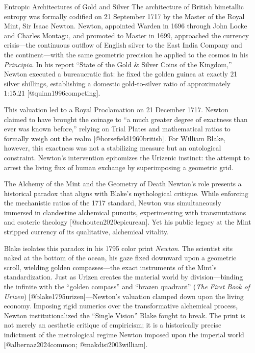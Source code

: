 \documentclass[
  ignorenonframetext,
]{beamer}
\author{\texorpdfstring{}{}}
\date{}
\begin{document}
\begin{frame}{Entropic Architectures of Gold and Silver}
\protect{}\label{entropic-architectures-of-gold-and-silver}
The architecture of British bimetallic entropy was formally codified on
21 September 1717 by the Master of the Royal Mint, Sir Isaac Newton.
Newton, appointed Warden in 1696 through John Locke and Charles Montagu,
and promoted to Master in 1699, approached the currency crisis---the
continuous outflow of English silver to the East India Company and the
continent---with the same geometric precision he applied to the cosmos
in his \emph{Principia}. In his report ``State of the Gold \& Silver
Coins of the Kingdom,'' Newton executed a bureaucratic fiat: he fixed
the golden guinea at exactly 21 silver shillings, establishing a
domestic gold-to-silver ratio of approximately 1:15.21
{[}@quinn1996competing{]}.

This valuation led to a Royal Proclamation on 21 December 1717. Newton
claimed to have brought the coinage to ``a much greater degree of
exactness than ever was known before,'' relying on Trial Plates and
mathematical ratios to formally weigh out the realm
{[}@horsefield1960british{]}. For William Blake, however, this exactness
was not a stabilizing measure but an ontological constraint. Newton's
intervention epitomizes the Urizenic instinct: the attempt to arrest the
living flux of human exchange by superimposing a geometric grid.

\begin{block}{The Alchemy of the Mint and the Geometry of Death}
\protect{}\label{the-alchemy-of-the-mint-and-the-geometry-of-death}
Newton's role presents a historical paradox that aligns with Blake's
mythological critique. While enforcing the mechanistic ratios of the
1717 standard, Newton was simultaneously immersed in clandestine
alchemical pursuits, experimenting with transmutations and esoteric
theology {[}@schouten2020epicurean{]}. Yet his public legacy at the Mint
stripped currency of its qualitative, alchemical vitality.

Blake isolates this paradox in his 1795 color print \emph{Newton}. The
scientist sits naked at the bottom of the ocean, his gaze fixed downward
upon a geometric scroll, wielding golden compasses---the exact
instruments of the Mint's standardization. Just as Urizen creates the
material world by division---binding the infinite with the ``golden
compass'' and ``brazen quadrant'' (\emph{The First Book of Urizen})
{[}@blake1795urizen{]}---Newton's valuation clamped down upon the living
economy. Imposing rigid numerics over the transformative alchemical
process, Newton institutionalized the ``Single Vision'' Blake fought to
break. The print is not merely an aesthetic critique of empiricism; it
is a historically precise indictment of the metrological regime Newton
imposed upon the imperial world {[}@albernaz2024common;
@makdisi2003william{]}.
\end{block}


\end{frame}
\end{document}

